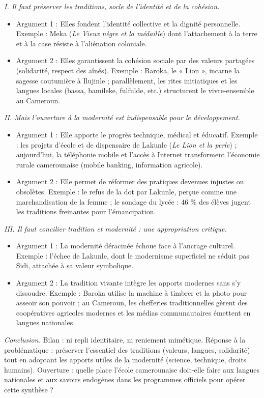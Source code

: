 \documentclass[11pt]{article}
\begin{document}
\begin{exoresolu}
\emph{I. Il faut préserver les traditions, socle de l'identité et de la cohésion.}
\begin{itemize}
\item Argument 1 : Elles fondent l'identité collective et la dignité personnelle. Exemple : Meka (\emph{Le Vieux nègre et la médaille}) dont l'attachement à la terre et à la case résiste à l'aliénation coloniale.
\item Argument 2 : Elles garantissent la cohésion sociale par des valeurs partagées (solidarité, respect des aînés). Exemple : Baroka, le « Lion », incarne la sagesse coutumière à Ilujinle ; parallèlement, les rites initiatiques et les langues locales (bassa, bamileke, fulfulde, etc.) structurent le vivre-ensemble au Cameroun.
\end{itemize}

\emph{II. Mais l'ouverture à la modernité est indispensable pour le développement.}
\begin{itemize}
\item Argument 1 : Elle apporte le progrès technique, médical et éducatif. Exemple : les projets d'école et de dispensaire de Lakunle (\emph{Le Lion et la perle}) ; aujourd'hui, la téléphonie mobile et l'accès à Internet transforment l'économie rurale camerounaise (mobile banking, information agricole).
\item Argument 2 : Elle permet de réformer des pratiques devenues injustes ou obsolètes. Exemple : le refus de la dot par Lakunle, perçue comme une marchandisation de la femme ; le sondage du lycée : 46 \% des élèves jugent les traditions freinantes pour l'émancipation.
\end{itemize}

\emph{III. Il faut concilier tradition et modernité : une appropriation critique.}
\begin{itemize}
\item Argument 1 : La modernité déracinée échoue face à l'ancrage culturel. Exemple : l'échec de Lakunle, dont le modernisme superficiel ne séduit pas Sidi, attachée à sa valeur symbolique.
\item Argument 2 : La tradition vivante intègre les apports modernes sans s'y dissoudre. Exemple : Baroka utilise la machine à timbrer et la photo pour asseoir son pouvoir ; au Cameroun, les chefferies traditionnelles gèrent des coopératives agricoles modernes et les médias communautaires émettent en langues nationales.
\end{itemize}

\emph{Conclusion.} Bilan : ni repli identitaire, ni reniement mimétique. Réponse à la problématique : préserver l'essentiel des traditions (valeurs, langues, solidarité) tout en adoptant les apports utiles de la modernité (science, technique, droits humains). Ouverture : quelle place l'école camerounaise doit-elle faire aux langues nationales et aux savoirs endogènes dans les programmes officiels pour opérer cette synthèse ?


\end{exoresolu}
\end{document}
